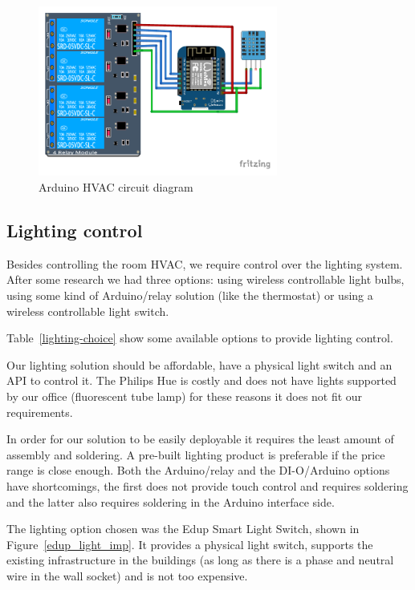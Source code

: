 \begin{figure}[h]
\centering
\includegraphics[width=0.7\textwidth]{Figures/arduino_imp}
\caption{Arduino HVAC circuit diagram}
\label{arduino_imp}
\end{figure}



\subsection{Lighting control}
Besides controlling the room \ac{HVAC}, we require control over the lighting system. After some research we had three options: using wireless controllable light bulbs, using some kind of Arduino/relay solution (like the thermostat) or using a wireless controllable light switch.

Table~\ref{lighting-choice} show some available options to provide lighting control.

Our lighting solution should be affordable, have a physical light switch and an API to control it. The Philips Hue is costly and does not have lights supported by our office (fluorescent tube lamp) for these reasons it does not fit our requirements.

In order for our solution to be easily deployable it requires the least amount of assembly and soldering. A pre-built lighting product is preferable if the price range is close enough. Both the Arduino/relay and the DI-O/Arduino options have shortcomings, the first does not provide touch control and requires soldering and the latter also requires soldering in the Arduino interface side.

The lighting option chosen was the Edup Smart Light Switch, shown in Figure~\ref{edup_light_imp}.  It provides a physical light switch, supports the existing infrastructure in the buildings (as long as there is a phase and neutral wire in the wall socket) and is not too expensive.


